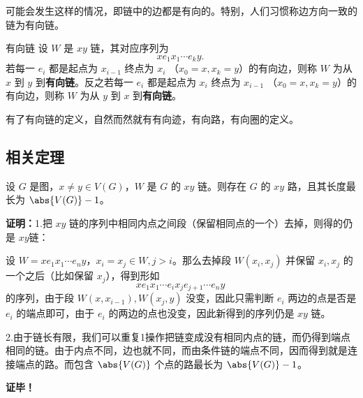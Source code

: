 可能会发生这样的情况，即链中的边都是有向的。特别，人们习惯称边方向一致的链为有向链。
\begin{definition}{有向链}\label{def_PatCyc_1}
设 $W$ 是 $xy$ 链，其对应序列为
\begin{equation}
xe_1x_1\cdots e_ky.~
\end{equation}
若每一 $e_i$ 都是起点为 $x_{i-1}$ 终点为 $x_i$ （$x_0=x,x_k=y$）的有向边，则称 $W$ 为从 $x$ 到 $y$ 到\textbf{有向链}。反之若每一 $e_i$ 都是起点为 $x_{i}$ 终点为 $x_{i-1}$ （$x_0=x,x_k=y$）的有向边，则称 $W$ 为从 $y$ 到 $x$ 到\textbf{有向链}。
\end{definition}
有了有向链的定义，自然而然就有有向迹，有向路，有向圈的定义。

 
\subsection{相关定理}
\begin{theorem}{}\label{the_PatCyc_1}
设 $G$ 是图，$x\neq y\in V(G)$，$W$ 是 $G$ 的 $xy$ 链。则存在 $G$ 的 $xy$ 路，且其长度最长为 $\abs{V(G)}-1$。
\end{theorem}

\textbf{证明：}1.把 $xy$ 链的序列中相同内点之间段（保留相同点的一个）去掉，则得的仍是 $xy$链：

设 $W=xe_1x_1\cdots e_n y$，$x_i=x_j\in W,j>i$。那么去掉段 $W(x_i,x_j)$ 并保留 $x_i,x_j$ 的一个之后（比如保留 $x_j$），得到形如 
\begin{equation}
xe_1x_1\cdots e_{i}x_j e_{j+1}\cdots e_n y~
\end{equation}
的序列，由于段 $W(x,x_{i-1}),W(x_j,y)$ 没变，因此只需判断 $e_i$ 两边的点是否是 $e_i$ 的端点即可，由于 $e_i$ 的两边的点也没变，因此新得到的序列仍是 $xy$ 链。

2.由于链长有限，我们可以重复1操作把链变成没有相同内点的链，而仍得到端点相同的链。由于内点不同，边也就不同，而由条件链的端点不同，因而得到就是连接端点的路。而包含 $\abs{V(G)}$ 个点的路最长为 $\abs{V(G)}-1$。


\textbf{证毕！}

















